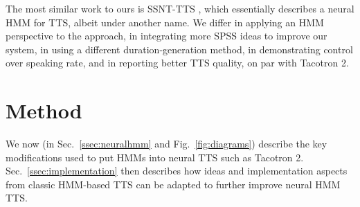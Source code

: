 \documentclass[british]{article}
\begin{document}
The most similar work to ours is SSNT-TTS \cite{yasuda2019initial}, which essentially describes a neural HMM for TTS, albeit under another name.
We differ in applying an HMM perspective to the approach, in integrating more SPSS ideas to improve our system, in using a different duration-generation method, in demonstrating control over speaking rate, and in reporting better TTS quality, on par with Tacotron 2.

\section{Method}
\label{sec:method}
We now (in Sec.\ \ref{ssec:neuralhmm} and Fig.\ \ref{fig:diagrams}) describe the key modifications used to put HMMs into neural TTS such as Tacotron 2.
Sec.\ \ref{ssec:implementation} then describes how ideas and implementation aspects from classic HMM-based TTS can be adapted to further improve neural HMM TTS.
\begin{figure*}[!t]
  \centering
  \hfill
  \caption{Synthesis-time architecture diagrams. Recurrences, delays, and the cumulative attention in Eq.\ \eqref{eq:decoder2} are drawn as grey arrows.}
\label{fig:diagrams}
  \vspace{-1\baselineskip}
\end{figure*}
\end{document}

